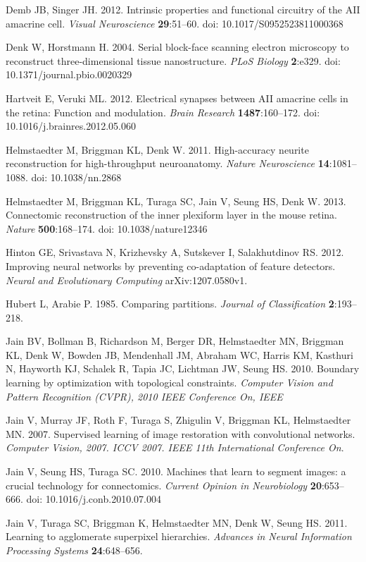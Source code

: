 \documentclass{article}
\begin{document}
\begin{hangpars}
Demb JB, Singer JH. 2012. Intrinsic properties and functional circuitry of the AII amacrine cell. \emph{Visual Neuroscience} \textbf{29}:51–60. doi: 10.1017/S0952523811000368

Denk W, Horstmann H. 2004. Serial block-face scanning electron microscopy to reconstruct three-dimensional tissue nanostructure. \emph{PLoS Biology} \textbf{2}:e329. doi: 10.1371/journal.pbio.0020329

Hartveit E, Veruki ML. 2012. Electrical synapses between AII amacrine cells in the retina: Function and modulation. \emph{Brain Research} \textbf{1487}:160–172. doi: 10.1016/j.brainres.2012.05.060

Helmstaedter M, Briggman KL, Denk W. 2011. High-accuracy neurite reconstruction for high-throughput neuroanatomy. \emph{Nature Neuroscience} \textbf{14}:1081–1088. doi: 10.1038/nn.2868

Helmstaedter M, Briggman KL, Turaga SC, Jain V, Seung HS, Denk W. 2013. Connectomic reconstruction of the inner plexiform layer in the mouse retina. \emph{Nature} \textbf{500}:168–174. doi: 10.1038/nature12346

Hinton GE, Srivastava N, Krizhevsky A, Sutskever I, Salakhutdinov RS. 2012. Improving neural networks by preventing co-adaptation of feature detectors. \emph{Neural and Evolutionary Computing} arXiv:1207.0580v1.

Hubert L, Arabie P. 1985. Comparing partitions. \emph{Journal of Classification} \textbf{2}:193–218.

Jain BV, Bollman B, Richardson M, Berger DR, Helmstaedter MN, Briggman KL, Denk W, Bowden JB, Mendenhall JM, Abraham WC, Harris KM, Kasthuri N, Hayworth KJ, Schalek R, Tapia JC, Lichtman JW, Seung HS. 2010. Boundary learning by optimization with topological constraints. \emph{Computer Vision and Pattern Recognition (CVPR), 2010 IEEE Conference On, IEEE}

Jain V, Murray JF, Roth F, Turaga S, Zhigulin V, Briggman KL, Helmstaedter MN. 2007. Supervised learning of image restoration with convolutional networks. \emph{Computer Vision, 2007. ICCV 2007. IEEE 11th International Conference On}.

Jain V, Seung HS, Turaga SC. 2010. Machines that learn to segment images: a crucial technology for connectomics. \emph{Current Opinion in Neurobiology} \textbf{20}:653–666. doi: 10.1016/j.conb.2010.07.004

Jain V, Turaga SC, Briggman K, Helmstaedter MN, Denk W, Seung HS. 2011. Learning to agglomerate superpixel hierarchies. \emph{Advances in Neural Information Processing Systems} \textbf{24}:648–656.


\end{hangpars}
\end{document}
